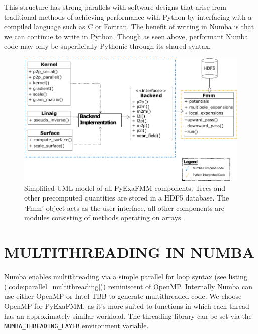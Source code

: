\documentclass{IEEEcsmag}
\begin{document}
This structure has strong parallels with software designs that arise from traditional methods of achieving performance with Python by interfacing with a compiled language such as C or Fortran. The benefit of writing in Numba is that we can continue to write in Python. Though as seen above, performant Numba code may only be superficially Pythonic through its shared syntax.

\begin{figure}
    \centerline{\includegraphics {figures/software.pdf}}
    \caption{Simplified UML model of all PyExaFMM components. Trees and other precomputed quantities are stored in a HDF5 database. The `Fmm' object acts as the user interface, all other components are modules consisting of methods operating on arrays.}
    \label{fig:design}
\end{figure}

\section{MULTITHREADING IN NUMBA}

Numba enables multithreading via a simple parallel for loop syntax (see listing (\ref{code:parallel_multithreading})) reminiscent of OpenMP. Internally Numba can use either OpenMP or Intel TBB to generate multithreaded code. We choose OpenMP for PyExaFMM, as it's more suited to functions in which each thread has an approximately similar workload. The threading library can be set via the \lstinline{NUMBA_THREADING_LAYER} environment variable.
\end{document}
